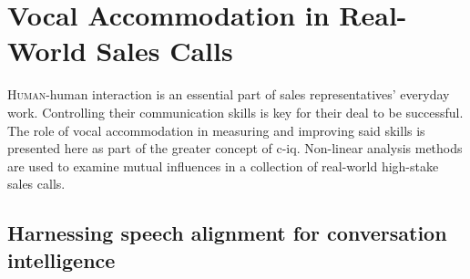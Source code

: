 \chapter{Vocal Accommodation in Real-World Sales Calls}
\label{chap:conv_analysis}

\lettrine{H}{uman}-human interaction is an essential part of sales representatives' everyday work.
Controlling their communication skills is key for their deal to be successful.
The role of vocal accommodation in measuring and improving said skills is presented here as part of the greater concept of \acl{c-iq}.
Non-linear analysis methods are used to examine mutual influences in a collection of real-world high-stake sales calls.

\pagebreak

\acresetall

\section{Harnessing speech alignment for conversation intelligence}
\label{sec:conversation_intelligence}

